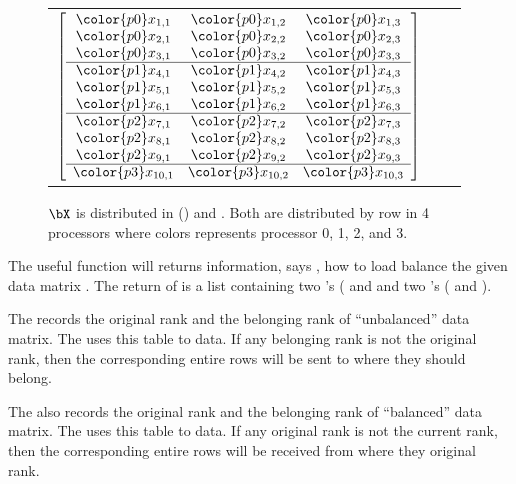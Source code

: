 \begin{figure}[h]
\begin{center}
\begin{tabular}{ccc}
$
\left[
\begin{array}{ccc}
\color{p0}x_{1,1} & \color{p0}x_{1,2} & \color{p0}x_{1,3} \\
\color{p0}x_{2,1} & \color{p0}x_{2,2} & \color{p0}x_{2,3} \\
\color{p0}x_{3,1} & \color{p0}x_{3,2} & \color{p0}x_{3,3} \\ \hline
\color{p1}x_{4,1} & \color{p1}x_{4,2} & \color{p1}x_{4,3} \\
\color{p1}x_{5,1} & \color{p1}x_{5,2} & \color{p1}x_{5,3} \\
\color{p1}x_{6,1} & \color{p1}x_{6,2} & \color{p1}x_{6,3} \\ \hline
\color{p2}x_{7,1} & \color{p2}x_{7,2} & \color{p2}x_{7,3} \\
\color{p2}x_{8,1} & \color{p2}x_{8,2} & \color{p2}x_{8,3} \\
\color{p2}x_{9,1} & \color{p2}x_{9,2} & \color{p2}x_{9,3} \\ \hline
\color{p3}x_{10,1} & \color{p3}x_{10,2} & \color{p3}x_{10,3} \\
\end{array}
\right]
$
\end{tabular}
\end{center}
\caption{
$\bX$ is distributed in
() and .
Both are distributed by row in 4 processors
where colors represents processor {\color{p0}0},
{\color{p1}1}, {\color{p2}2}, and {\color{p3}3}.
}
\end{figure}
 

The useful function  will returns information, says
,
how to load balance the given data matrix .
The return of  is a list containing
two 's ( and 
and two 's ( and ).

The  records the original rank and the belonging rank of
``unbalanced'' data matrix.
The  uses this table to  data.
If any belonging rank is not the original rank, then the corresponding
entire rows will be sent to where they should belong.

The  also records the original rank and the belonging rank of
``balanced'' data matrix.
The  uses this table to  data.
If any original rank is not the current rank, then the corresponding
entire rows will be received from where they original rank.

